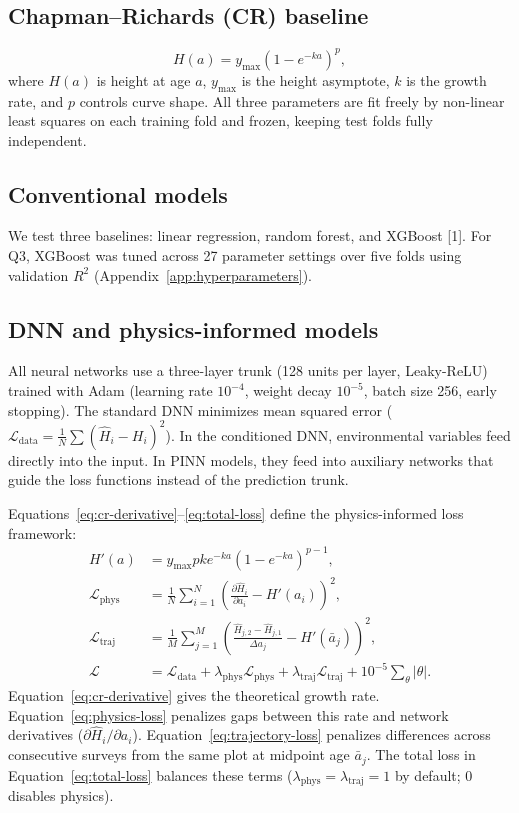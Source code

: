 \documentclass[logo,msc,ai]{infthesis}           %
\begin{document}
\subsection{Chapman--Richards (CR) baseline}
\begin{equation}
H(a) = y_{\max}\left(1 - e^{-ka}\right)^p,
\label{eq:cr}
\end{equation}
where $H(a)$ is height at age $a$, $y_{\max}$ is the height asymptote, $k$ is the growth rate, and $p$ controls curve shape. All three parameters are fit freely by non-linear least squares on each training fold and frozen, keeping test folds fully independent.

\subsection*{Conventional models}
We test three baselines: linear regression, random forest, and XGBoost [1]. For Q3, XGBoost was tuned across 27 parameter settings over five folds using validation $R^2$ (Appendix~\ref{app:hyperparameters}).

\subsection{DNN and physics-informed models}
All neural networks use a three-layer trunk (128 units per layer, Leaky-ReLU) trained with Adam (learning rate $10^{-4}$, weight decay $10^{-5}$, batch size 256, early stopping). The standard DNN minimizes mean squared error ($\mathcal{L}_{\mathrm{data}} = \frac{1}{N}\sum (\hat H_i-H_i)^2$). In the conditioned DNN, environmental variables feed directly into the input. In PINN models, they feed into auxiliary networks that guide the loss functions instead of the prediction trunk.

Equations~\eqref{eq:cr-derivative}--\eqref{eq:total-loss} define the physics-informed loss framework:
\begin{align}
H'(a) &= y_{\max}pk e^{-ka}\left(1-e^{-ka}\right)^{p-1}, \label{eq:cr-derivative} \\
\mathcal{L}_{\mathrm{phys}} &= \frac{1}{N}\sum_{i=1}^{N}\left(\frac{\partial\hat H_i}{\partial a_i}-H'(a_i)\right)^2, \label{eq:physics-loss} \\
\mathcal{L}_{\mathrm{traj}} &= \frac{1}{M}\sum_{j=1}^{M}\left(\frac{\hat H_{j,2}-\hat H_{j,1}}{\Delta a_j}-H'(\bar a_j)\right)^2, \label{eq:trajectory-loss} \\
\mathcal{L} &= \mathcal{L}_{\mathrm{data}} + \lambda_{\mathrm{phys}}\mathcal{L}_{\mathrm{phys}} + \lambda_{\mathrm{traj}}\mathcal{L}_{\mathrm{traj}} + 10^{-5}\sum_{\theta}|\theta|. \label{eq:total-loss}
\end{align}
Equation~\eqref{eq:cr-derivative} gives the theoretical growth rate. Equation~\eqref{eq:physics-loss} penalizes gaps between this rate and network derivatives ($\partial\hat H_i/\partial a_i$). Equation~\eqref{eq:trajectory-loss} penalizes differences across consecutive surveys from the same plot at midpoint age $\bar a_j$. The total loss in Equation~\eqref{eq:total-loss} balances these terms ($\lambda_{\mathrm{phys}}=\lambda_{\mathrm{traj}}=1$ by default; 0 disables physics). 
\end{document}
